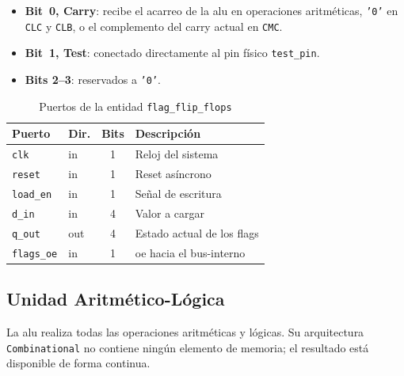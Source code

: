 \documentclass[%
    school=etsisi,%
    type=pfg,%
    degree=61CI,%
]{upm-report}
\newcommand{\vhdlfile}[1]{%
    \par\noindent{\small\sffamily\color{gray}Fichero: \texttt{#1}}\par\smallskip
}
\begin{document}
\begin{itemize}
    \item \textbf{Bit~0, Carry}: recibe el acarreo de la \acrshort{alu} en
        operaciones aritméticas, \texttt{'0'} en \texttt{CLC} y \texttt{CLB},
        o el complemento del carry actual en \texttt{CMC}.
    \item \textbf{Bit~1, Test}: conectado directamente al pin físico
        \texttt{test\_pin}.
    \item \textbf{Bits 2--3}: reservados a \texttt{'0'}.
\end{itemize}

\begin{table}[H]
\centering
\caption{Puertos de la entidad \texttt{flag\_flip\_flops}}
\label{tab:flags}
\begin{tabularx}{\textwidth}{@{}llcX@{}}
\toprule
\textbf{Puerto}    & \textbf{Dir.} & \textbf{Bits} & \textbf{Descripción} \\
\midrule
\texttt{clk}       & in  & 1 & Reloj del sistema \\
\texttt{reset}     & in  & 1 & Reset asíncrono \\
\texttt{load\_en}  & in  & 1 & Señal de escritura \\
\texttt{d\_in}     & in  & 4 & Valor a cargar \\
\texttt{q\_out}    & out & 4 & Estado actual de los flags \\
\texttt{flags\_oe} & in  & 1 & \acrshort{oe} hacia el \gls{bus-interno} \\
\bottomrule
\end{tabularx}
\end{table}

\subsection{Unidad Aritmético-Lógica}
\label{ss:alu}
\vhdlfile{alu.vhd}

La \acrfull{alu} realiza todas las operaciones aritméticas y lógicas.  Su
arquitectura \texttt{Combinational} no contiene ningún elemento de memoria;
el resultado está disponible de forma continua.
\end{document}

